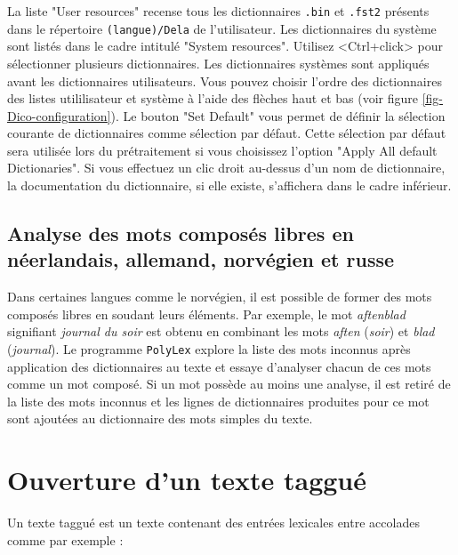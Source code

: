 \bigskip
\noindent La liste "User resources" recense tous les dictionnaires \verb+.bin+ et \verb+.fst2+
présents dans le répertoire \verb+(langue)/Dela+ de l’utilisateur. Les dictionnaires du système sont
listés dans le cadre intitulé "System resources". Utilisez <Ctrl+click> pour sélectionner plusieurs
dictionnaires. Les dictionnaires systèmes sont appliqués avant les dictionnaires utilisateurs.
Vous pouvez choisir l'ordre des dictionnaires des listes utililisateur et système à l'aide des
flèches haut et bas (voir figure \ref{fig-Dico-configuration}). Le bouton "Set Default" vous permet
de définir la sélection courante de dictionnaires comme sélection par défaut. Cette sélection par
défaut sera utilisée lors du prétraitement si vous choisissez l’option "Apply All default
Dictionaries".
Si vous effectuez un clic droit au-dessus d’un nom de dictionnaire, la documentation du
dictionnaire, si elle existe, s’affichera dans le cadre inférieur.


\subsection{Analyse des mots composés libres en néerlandais, allemand, norvégien et russe}

\label{section-Norwegian-compound-words}
Dans certaines langues comme le norvégien, il est possible de former des mots composés
libres en soudant leurs éléments. Par exemple, le mot \textit{aftenblad} signifiant \textit{journal
du soir} est obtenu en combinant les mots \textit{aften} (\textit{soir}) et \textit{blad}
(\textit{journal}). Le programme \verb+PolyLex+  explore la liste des mots inconnus après application des dictionnaires au
texte et essaye d’analyser chacun de ces mots comme un mot composé. Si un mot possède au moins une
analyse, il est retiré de la liste des mots inconnus et les lignes de dictionnaires produites pour
ce mot sont ajoutées au dictionnaire des mots simples du texte.

\section{Ouverture d’un texte taggué}
Un texte taggué est un texte contenant des entrées lexicales entre accolades comme par
exemple :


